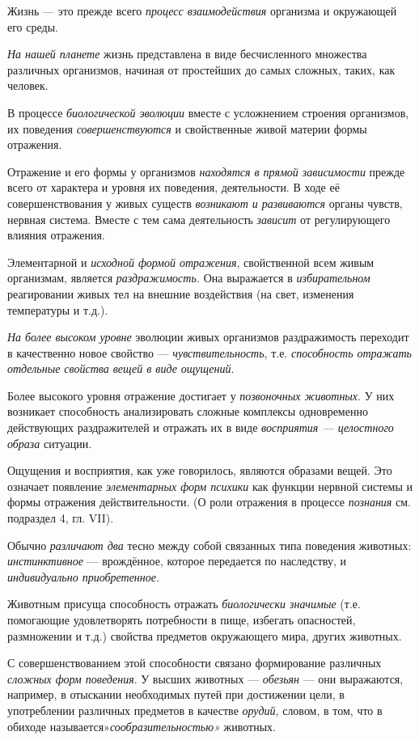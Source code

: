 \documentclass[a4paper,14pt,russian]{extreport}
\begin{document}
Жизнь --- это прежде всего \emph{процесс взаимодействия} организма и окружающей его среды.

\emph{На нашей планете} жизнь представлена в виде бесчисленного множества различных организмов, начиная от простейших до самых сложных, таких, как человек.

В процессе \emph{биологической эволюции} вместе с усложнением строения организмов, их поведения \emph{совершенствуются} и свойственные живой материи формы отражения.

Отражение и его формы у организмов \emph{находятся в прямой зависимости} прежде всего от характера и уровня их поведения, деятельности. В ходе её совершенствования у живых существ \emph{возникают и развиваются} органы чувств, нервная система. Вместе с тем сама деятельность \emph{зависит} от регулирующего влияния отражения.

Элементарной и \emph{исходной формой отражения}, свойственной всем живым организмам, является \emph{раздражимость.} Она выражается в \emph{избирательном} реагировании живых тел на внешние воздействия (на свет, изменения температуры и т.д.).

\emph{На более высоком уровне} эволюции живых организмов раздражимость переходит в качественно новое свойство --- \emph{чувствительность}, т.е. \emph{способность отражать отдельные свойства вещей в виде ощущений}.

Более высокого уровня отражение достигает у \emph{позвоночных животных}. У них возникает способность анализировать сложные комплексы одновременно действующих раздражителей и отражать их в виде \emph{восприятия --- целостного образа} ситуации.

Ощущения и восприятия, как уже говорилось, являются образами вещей. Это означает появление \emph{элементарных форм психики} как функции нервной системы и формы отражения действительности. (О роли отражения в процессе \emph{познания} см. подраздел 4, гл. VII).

Обычно \emph{различают два} тесно между собой связанных типа поведения животных: \emph{инстинктивное} --- врождённое, которое передается по наследству, и \emph{индивидуально приобретенное}.

Животным присуща способность отражать \emph{биологически значимые} (т.е. помогающие удовлетворять потребности в пище, избегать опасностей, размножении и т.д.) свойства предметов окружающего мира, других животных.

С совершенствованием этой способности связано формирование различных \emph{сложных форм поведения}. У высших животных --- \emph{обезьян} --- они выражаются, например, в отыскании необходимых путей при достижении цели, в употреблении различных предметов в качестве \emph{орудий}, словом, в том, что в обиходе называется»\emph{сообразительностью»} животных.
\end{document}
